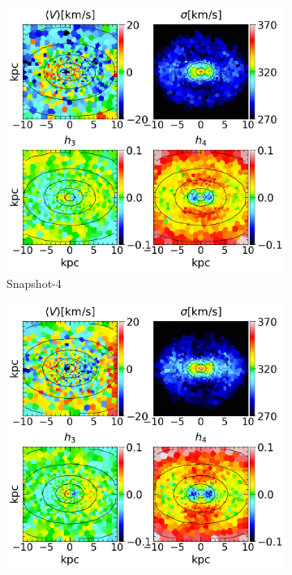 \documentclass[english, oneside]{HYgradu}
\begin{document}
\begin{figure}
	\centering
	\begin{subfigure}[b]{0.49\textwidth}
		\includegraphics[width=\textwidth]{BH_4.png}
		\caption{Snapshot-4}
	\end{subfigure}
	\begin{subfigure}[b]{0.49\textwidth}
		\includegraphics[width=\textwidth]{BH_5.png}

\end{subfigure}
\end{figure}
\end{document}
